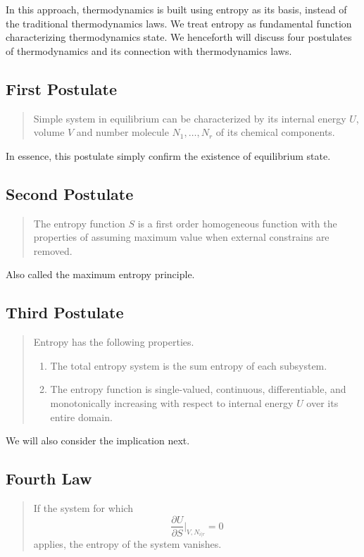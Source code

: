 \documentclass[../../../Main.tex]{subfiles}
\begin{document}
In this approach, thermodynamics is built using entropy as its basis, instead of the traditional thermodynamics laws. We treat entropy as fundamental function characterizing thermodynamics state. We henceforth will discuss four postulates of thermodynamics and its connection with thermodynamics laws.

\subsection{First Postulate}
\begin{quote}
    Simple system in equilibrium can be characterized by its internal energy $U$, volume $V$ and number molecule $N_1,\dots,N_r$ of its chemical components.
\end{quote}

In essence, this postulate simply confirm the existence of equilibrium state.

\subsection{Second Postulate}
\begin{quote}
    The entropy function $S$ is a first order homogeneous function with the properties of assuming maximum value when external constrains are removed.
\end{quote}

Also called the maximum entropy principle.

\subsection{Third Postulate}
\begin{quote}
    Entropy has the following properties.
\begin{enumerate}
    \item The total entropy system is the sum entropy of each subsystem. 
    \item The entropy function is single-valued, continuous, differentiable, and monotonically increasing with respect to internal energy $U$ over its entire domain.
\end{enumerate}
\end{quote}

We will also consider the implication next.

\subsection{Fourth Law}
\begin{quote}
    If the system for which
\begin{equation*}
    \frac{\partial U}{\partial S}\bigg|_{V,N_{i|r}}=0
\end{equation*}
applies, the entropy of the system vanishes.
\end{quote}
\end{document}
